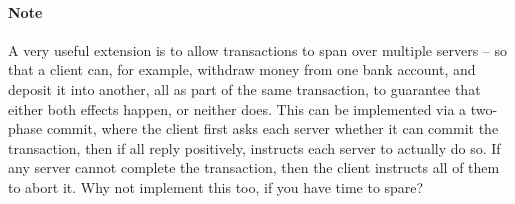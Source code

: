 \documentclass{article}
\begin{document}
\paragraph{Note}

A very useful extension is to allow transactions to span over multiple
servers -- so that a client can, for example, withdraw money from one
bank account, and deposit it into another, all as part of the same
transaction, to guarantee that either both effects happen, or neither
does. This can be implemented via a two-phase commit, where the client
first asks each server whether it can commit the transaction, then if
all reply positively, instructs each server to actually do so. If any
server cannot complete the transaction, then the client instructs all
of them to abort it. Why not implement this too, if you have time to
spare?
\end{document}
